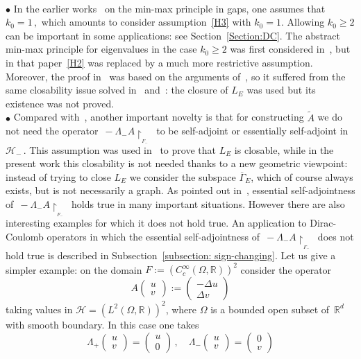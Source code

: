 \documentclass[12pt,reqno]{amsart}
\newcommand{\R}{{\mathbb R}}
\newcommand{\be}[1]{\begin{equation}\label{#1}}
\newcommand{\ee}{\end{equation}}
\renewcommand{\(}{\left(}
\renewcommand{\)}{\right)}
\begin{document}
\\[2pt] $\bullet$
In the earlier works~\cite{GS99,Griesemer1999,DES00a,DES00b,DES03,MorMul-15,M16,ELS19,SST20} on the min-max principle in gaps, one assumes that $k_0=1\,,$ which amounts to consider assumption~\eqref{H3} with $k_0=1$. Allowing $k_0\ge 2$ can be important in some applications: see Section~\ref{Section:DC}. The abstract min-max principle for eigenvalues in the case $k_0\ge 2$ was first considered in~\cite{DES06}, but in that paper~\eqref{H2} was replaced by a much more restrictive assumption. Moreover, the proof in~\cite{DES06} was based on the arguments of~\cite{DES00a}, so it suffered from the same closability issue solved in~\cite{SST20} and~\cite[Corrigendum]{DES00a}: the closure of $L_E$ was used but its existence was not proved.
\\[2pt] $\bullet$ Compared with~\cite{EstLos-08,SST20}, another important novelty is that for constructing $\widetilde A$ we do not need the operator $\,-\Lambda_- A\upharpoonright_{_{F_-}}\,$ to be self-adjoint or essentially self-adjoint in $\mathcal H_-\,$. This assumption was used in~\cite{SST20} to prove that $L_E$ is closable, while in the present work this closability is not needed thanks to a new geometric viewpoint: instead of trying to close $L_E$ we consider the subspace $\overline{\Gamma}_E$, which of course always exists, but is not necessarily a graph. As pointed out in~\cite{SST20}, essential self-adjointness of $\,-\Lambda_- A\upharpoonright_{_{F_-}}\,$ holds true in many important situations. However there are also interesting examples for which it does not hold true. An application to Dirac-Coulomb operators in which the essential self-adjointness of $\,-\Lambda_- A\upharpoonright_{_{F_-}}\,$ does not hold true is described in Subsection~\ref{subsection: sign-changing}. Let us give a simpler example: on the domain $F:=\(C^\infty_c(\Omega, \R)\)^2 $ consider the operator
\be{exampleDelta}
A\begin{pmatrix} u\\v\end{pmatrix}:= \begin{pmatrix} -\Delta u\\\Delta v\end{pmatrix}
\ee
taking values in $\mathcal H= \(L^2(\Omega, \R)\)^2$, where $\Omega$ is a bounded open subset of $\,\R^d$ with smooth boundary. In this case one takes 
\[
\Lambda_+\begin{pmatrix} u\\v\end{pmatrix}=\begin{pmatrix} u\\0\end{pmatrix}\,,\quad\Lambda_-\begin{pmatrix} u\\v\end{pmatrix}=\begin{pmatrix} 0\\v\end{pmatrix}
\]
\end{document}
